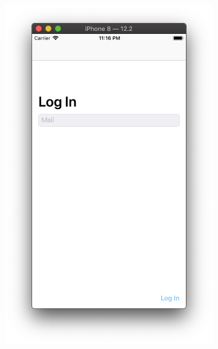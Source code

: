 \documentclass[a4paper,12pt]{article}
\begin{document}
	\begin{figure}[h!]
		\centering
		\begin{subfigure}[b]{0.3\linewidth}
			\includegraphics[width=\linewidth]{../includes/pmi/login.png}
		\end{subfigure}
		\begin{subfigure}[b]{0.3\linewidth}

\end{subfigure}
\end{figure}
\end{document}
